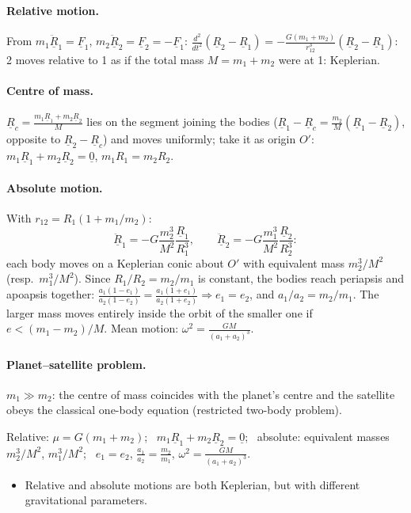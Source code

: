 \paragraph{Relative motion.} From $m_1\ddot{\underline R}_1=\underline F_1$, $m_2\ddot{\underline R}_2=\underline F_2=-\underline F_1$:
$\frac{d^2}{dt^2}(\underline R_2-\underline R_1)=-\frac{G(m_1+m_2)}{r_{12}^3}(\underline R_2-\underline R_1)$: 2 moves relative to 1 as if the total mass
$M=m_1+m_2$ were at 1: Keplerian.
\paragraph{Centre of mass.} $\underline R_c=\frac{m_1\underline R_1+m_2\underline R_2}{M}$ lies on the segment joining the bodies
($\underline R_1-\underline R_c=\frac{m_2}{M}(\underline R_1-\underline R_2)$, opposite to $\underline R_2-\underline R_c$) and moves uniformly; take it as origin $O'$:
$m_1\underline R_1+m_2\underline R_2=\underline 0$, $m_1R_1=m_2R_2$.
\paragraph{Absolute motion.} With $r_{12}=R_1(1+m_1/m_2)$:
\begin{equation}
\ddot{\underline R}_1=-G\frac{m_2^3}{M^2}\frac{\underline R_1}{R_1^3},\qquad \ddot{\underline R}_2=-G\frac{m_1^3}{M^2}\frac{\underline R_2}{R_2^3}:
\end{equation}
each body moves on a Keplerian conic about $O'$ with equivalent mass $m_2^3/M^2$ (resp.\ $m_1^3/M^2$). Since $R_1/R_2=m_2/m_1$ is constant, the bodies
reach periapsis and apoapsis together: $\frac{a_1(1-e_1)}{a_2(1-e_2)}=\frac{a_1(1+e_1)}{a_2(1+e_2)}\Rightarrow e_1=e_2$, and $a_1/a_2=m_2/m_1$. The larger
mass moves entirely inside the orbit of the smaller one if $e<(m_1-m_2)/M$. Mean motion: $\omega^2=\frac{GM}{(a_1+a_2)^3}$.
\paragraph{Planet--satellite problem.} $m_1\gg m_2$: the centre of mass coincides with the planet's centre and the satellite obeys the classical
one-body equation (restricted two-body problem).
\begin{keyf}
Relative: $\mu=G(m_1+m_2)$; \ $m_1\underline R_1+m_2\underline R_2=\underline 0$; \ absolute: equivalent masses $m_2^3/M^2$, $m_1^3/M^2$; \ $e_1=e_2$, $\frac{a_1}{a_2}=\frac{m_2}{m_1}$, $\omega^2=\frac{GM}{(a_1+a_2)^3}$.
\end{keyf}
\pitfalls
\begin{itemize}
\item Relative and absolute motions are both Keplerian, but with different gravitational parameters.
\end{itemize}

